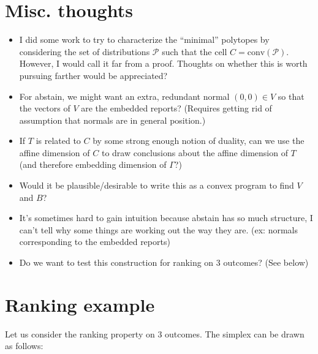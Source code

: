 \documentclass[12pt]{article}
\renewcommand{\P}{\mathcal{P}}
\newcommand{\conv}{\mathrm{conv}}
\begin{document}
\section{Misc. thoughts}
\begin{itemize}
	\item I did some work to try to characterize the ``minimal'' polytopes by considering the set of distributions $\P$ such that the cell $C = \conv(\P)$.
	However, I would call it far from a proof.
	Thoughts on whether this is worth pursuing farther would be appreciated?
	
	\item For abstain, we might want an extra, redundant normal $(0,0) \in V$ so that the vectors of $V$ are the embedded reports?  
	(Requires getting rid of assumption that normals are in general position.)
	
	\item If $T$ is related to $C$ by some strong enough notion of duality, can we use the affine dimension of $C$ to draw conclusions about the affine dimension of $T$ (and therefore embedding dimension of $\Gamma$?) 
	
	\item Would it be plausible/desirable to write this as a convex program to find $V$ and $B$?

	\item It's sometimes hard to gain intuition because abstain has so much structure, I can't tell why some things are working out the way they are. (ex: normals corresponding to the embedded reports)
	
	\item Do we want to test this construction for ranking on 3 outcomes?  (See below)
	
\end{itemize}

\section{Ranking example}
Let us consider the ranking property on $3$ outcomes.
The simplex can be drawn as follows:
\end{document}
